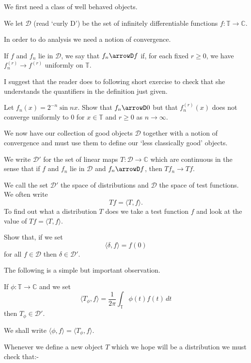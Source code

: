 We first need a class of well behaved objects.
\begin{definition} We let ${\mathcal D}$
(read `curly D') be the set of infinitely differentiable
functions $f:{\mathbb T}\rightarrow{\mathbb C}$.
\end{definition}
In order to do analysis we need a notion of convergence.
\begin{definition} If $f$ and $f_{n}$ lie in
${\mathcal D}$, we say that $f_{n}\arrowD f$
if, for each fixed $r\geq 0$, we have $f_{n}^{(r)}\rightarrow f^{(r)}$
uniformly on ${\mathbb T}$.
\end{definition}
I suggest that the reader does to following short exercise
to check that she understands the quantifiers in the
definition just given.
\begin{exercise} Let $f_{n}(x)=2^{-n}\sin nx$. Show
that $f_{n}\arrowD 0$ but that $f_{n}^{(r)}(x)$ does not
converge uniformly to $0$ for $x\in {\mathbb T}$
and $r\geq 0$ as $n\rightarrow\infty$.
\end{exercise}

We now have our collection of good objects ${\mathcal D}$
together with a notion of convergence and must use them to
define our `less classically good' objects.
\begin{definition} We write ${\mathcal D}'$
for the set of linear maps $T:{\mathcal D}\rightarrow{\mathbb C}$
which are continuous in the sense that
if $f$ and $f_{n}$ lie in
${\mathcal D}$ and $f_{n}\arrowD f$,
then $Tf_{n}\rightarrow Tf$.
\end{definition}
We call the set ${\mathcal D}'$ the space of distributions
and ${\mathcal D}$ the space of test functions. We
often write
\[Tf=\langle T,f\rangle.\]
To find out what a distribution $T$ does we take
a test function $f$ and look at the value of
$Tf=\langle T,f\rangle$.
\begin{exercise} Show that, if we set
\[\langle \delta,f\rangle=f(0)\]
for all $f\in{\mathcal D}$ then $\delta\in{\mathcal D}'$.
\end{exercise}
The following is a simple but important observation.
\begin{lemma}\label{smooth distributions}
If $\phi:{\mathbb T}\rightarrow {\mathbb C}$
and we set
\[\langle T_{\phi},f\rangle=
\frac{1}{2\pi}\int_{\mathbb T}\phi(t) f(t)\,dt \]
then $T_{\phi}\in{\mathcal D}'$.
\end{lemma}
We shall write $\langle \phi,f\rangle=\langle T_{\phi},f\rangle$.

Whenever we define a new object $T$ which we hope
will be a distribution we must check that:-

